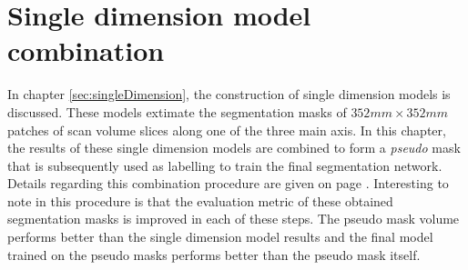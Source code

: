 \chapter{Single dimension model combination\label{sec:combination}}\thispagestyle{empty}

In chapter \ref{sec:singleDimension}, the construction of single dimension models is discussed.
These models extimate the segmentation masks of $352 mm\times 352 mm$ patches of scan volume slices along one of the three main axis.
In this chapter, the results of these single dimension models are combined to form a \textit{pseudo} mask that is subsequently used as labelling to train the final segmentation network.
Details regarding this combination procedure are given on page \pageref{sec:combinationProcedure}.
Interesting to note in this procedure is that the evaluation metric of these obtained segmentation masks is improved in each of these steps.
The pseudo mask volume performs better than the single dimension model results and the final model trained on the pseudo masks performs better than the pseudo mask itself. 

